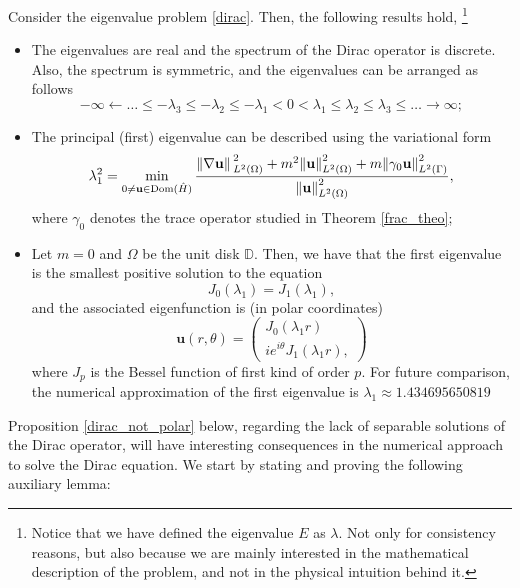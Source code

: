 \begin{proposition}\label{dirac_properties}
    Consider the eigenvalue problem \eqref{dirac}. Then, the following results hold, \footnote{Notice that we have defined the eigenvalue \(E\) as \(\lambda\). Not only for consistency reasons, but also because we are mainly interested in the mathematical description of the problem, and not in the physical intuition behind it.}
    \begin{itemize}
        \item The eigenvalues are real and the spectrum of the Dirac operator is discrete. Also, the spectrum is symmetric, and the eigenvalues can be arranged as follows
        \[
        -\infty \leftarrow \dots \leq -\lambda_3 \leq -\lambda_2 \leq -\lambda_1 < 0 < \lambda_1 \leq \lambda_2 \leq \lambda_3 \leq \dots \rightarrow \infty;
        \]
        \item The principal (first) eigenvalue can be described using the variational form
        \[
        \lambda_1^2 = \min_{0 \neq \mathbf{u} \in \operatorname{Dom}(\hat{H})}\frac{\norm*{\nabla \mathbf{u}}_{L^2(\Omega)}^2 + m^2 \norm{\mathbf{u}}_{L^2(\Omega)}^2 + m \norm{\gamma_0 \mathbf{u}}_{L^2(\Gamma)}^2}{\norm{\mathbf{u}}_{L^2(\Omega)}^2},
        \]
        where \(\gamma_0\) denotes the trace operator studied in Theorem \ref{frac_theo};
        \item Let \(m=0\) and \(\Omega\) be the unit disk \(\mathbb{D}\). Then, we have that the first eigenvalue is the smallest positive solution to the equation
        \[
        J_0(\lambda_1) = J_1(\lambda_1),
        \]
        and the associated eigenfunction is (in polar coordinates)
        \[
            \mathbf{u}(r, \theta) = \begin{pmatrix}
            J_0(\lambda_1 r)\\
            i e^{i \theta}J_1(\lambda_1 r),
        \end{pmatrix}
        \]
        where \(J_p\) is the Bessel function of first kind of order \(p\).
        For future comparison, the numerical approximation of the first eigenvalue is \(\lambda_1 \approx 1.434695650819\)
    \end{itemize}
\end{proposition}

Proposition \ref{dirac_not_polar} below, regarding the lack of separable solutions of the Dirac operator, will have interesting consequences in the numerical approach to solve the Dirac equation. We start by stating and proving the following auxiliary lemma:

